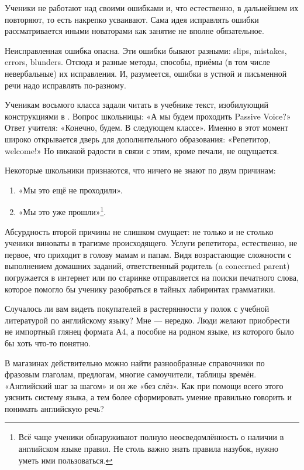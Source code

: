 Ученики не работают над своими ошибками и, что естественно, в дальнейшем их повторяют, то есть накрепко усваивают. Сама идея исправлять ошибки рассматривается иными новаторами как занятие не вполне обязательное.

Неисправленная ошибка опасна. Эти ошибки бывают разными: slips, mistakes, errors, blunders. Отсюда и разные методы, способы, приёмы (в том числе невербальные) их исправления. И, разумеется, ошибки в устной и письменной речи надо исправлять по-разному.

Ученикам восьмого класса задали читать в учебнике текст, изобилующий конструкциями в . Вопрос школьницы: «А мы будем проходить Passive Voice?» Ответ учителя: «Конечно, будем. В следующем классе». Именно в этот момент широко открывается дверь для дополнительного образования: «Репетитор, welcome!» Но никакой радости в связи с этим, кроме печали, не ощущается.

Некоторые школьники признаются, что ничего не знают по двум причинам:

\begin{enumerate}
    \item «Мы это ещё не проходили».
    \item «Мы это уже прошли»\footnote{Всё чаще ученики обнаруживают полную неосведомлённость о наличии в английском языке правил. Не столь важно знать правила назубок, нужно уметь ими пользоваться.}.
\end{enumerate}

Абсурдность второй причины не слишком смущает: не только и не столько ученики виноваты в трагизме происходящего. Услуги репетитора, естественно, не первое, что приходит в голову мамам и папам. Видя возрастающие сложности с выполнением домашних заданий, ответственный родитель (a concerned parent) погружается в интернет или по старинке отправляется на поиски печатного слова, которое помогло бы ученику разобраться в тайных лабиринтах грамматики.

Случалось ли вам видеть покупателей в растерянности у полок с учебной литературой по английскому языку? Мне — нередко. Люди желают приобрести не импортный глянец формата А4, а пособие на родном языке, из которого было бы хоть что-то понятно.

В магазинах действительно можно найти разнообразные справочники по фразовым глаголам, предлогам, многие самоучители, таблицы времён. «Английский шаг за шагом» и он же «без слёз». Как при помощи всего этого уяснить систему языка, а тем более сформировать умение правильно говорить и понимать английскую речь?


